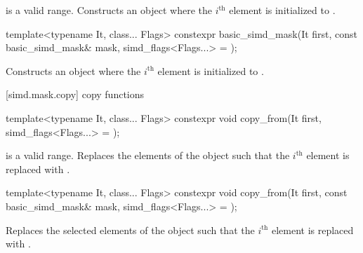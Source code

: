 \begin{itemdescr}
  \MaskLoadDescr
    {\tcode{[first, first + size())} is a valid range.}
    {Constructs an object where the $i^\text{th}$ element is initialized to  \foralli.}
\end{itemdescr}

\begin{itemdecl}
template<typename It, class... Flags>
  constexpr basic_simd_mask(It first, const basic_simd_mask& mask, simd_flags<Flags...> = {});
\end{itemdecl}

\begin{itemdescr}
  \MaskLoadDescr
    {\validMaskedRange}
    {Constructs an object where the $i^\text{th}$ element is initialized to  \foralli.}
\end{itemdescr}

[simd.mask.copy]{ copy functions}

\begin{itemdecl}
template<typename It, class... Flags>
  constexpr void copy_from(It first, simd_flags<Flags...> = {});
\end{itemdecl}

\begin{itemdescr}
  \MaskLoadDescr
  {\tcode{[first, first + size())} is a valid range.}
  {Replaces the elements of the  object such that the $i^\text{th}$ element is replaced with  \foralli.}
\end{itemdescr}

\begin{itemdecl}
template<typename It, class... Flags>
  constexpr void copy_from(It first, const basic_simd_mask& mask, simd_flags<Flags...> = {});
\end{itemdecl}

\begin{itemdescr}
  \MaskLoadDescr
    {\validMaskedRange}
    {Replaces the selected elements of the  object such that the $i^\text{th}$ element is replaced with  \forallmaskedi.}
\end{itemdescr}

